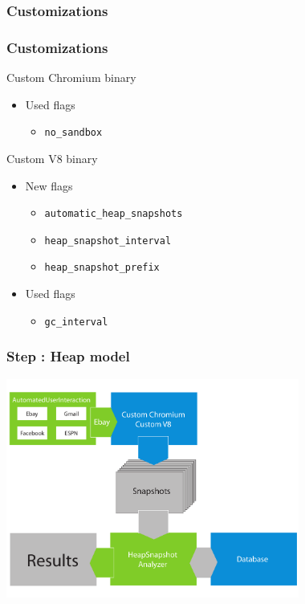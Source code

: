 \documentclass[xcolor=x11names,compress]{beamer}
\begin{document}
	\subsubsection{Customizations}
	\begin{frame}
		\frametitle{Customizations}
				Custom Chromium binary
				\begin{itemize}
					\item Used flags
					\begin{itemize}
						\item \texttt{no\_sandbox} 						%
					\end{itemize}
				\end{itemize}
			
				Custom V8 binary
				\begin{itemize}
					\item New flags
					\begin{itemize}
						\item \texttt{automatic\_heap\_snapshots} 		%
						\item \texttt{heap\_snapshot\_interval} 		%
						\item \texttt{heap\_snapshot\_prefix} 			%
					\end{itemize}
					\item Used flags
					\begin{itemize}
						\item \texttt{gc\_interval} 					%
					\end{itemize}
				\end{itemize}
	\end{frame}
	
	\begin{frame}
		\frametitle{Step \theStepCounter: Heap model}		
		\includegraphics[width=26em]{./imgs/solution_h.pdf}
	\end{frame}
	
\end{document}
